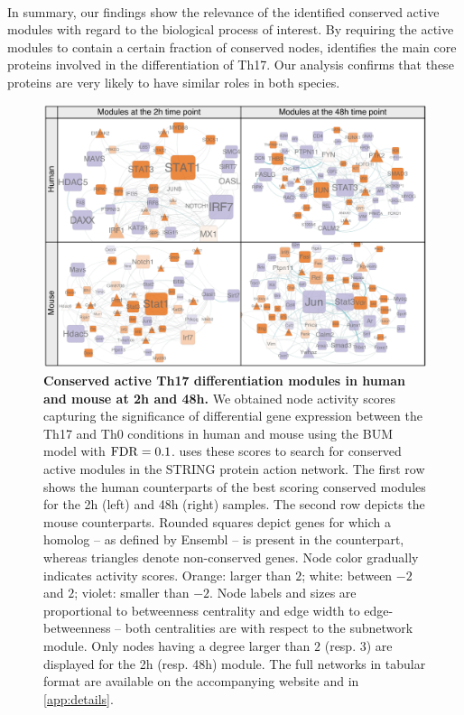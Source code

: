 \paragraph{}
In summary, our findings show the relevance of the identified conserved active modules with regard to the biological process of interest.
By requiring the active modules to contain a certain fraction of conserved nodes, \xheinz{} identifies the main core proteins involved in the differentiation of Th17.
Our analysis confirms that these proteins are very likely to have similar roles in both species.

\begin{figure}[t]
  \centering
  \includegraphics[width=\linewidth]{img/modules_panel.pdf}
  \caption[Conserved active Th17 differentiation modules in human and mouse at \unit{2}{h} and \unit{48}{h}]{\textbf{Conserved active Th17 differentiation modules in human and mouse at \unit{2}{h} and \unit{48}{h}.}
  We obtained node activity scores capturing the significance of differential gene expression between the Th17 and Th0 conditions in human and mouse using the BUM model with $\mathrm{FDR} = 0.1$.
  \xheinz{} uses these scores to search for conserved active modules in the STRING protein action network.
  The first row shows the human counterparts of the best scoring conserved modules for the \unit{2}{h} (left) and \unit{48}{h} (right) samples.
  The second row depicts the mouse counterparts.
  Rounded squares depict genes for which a homolog -- as defined by Ensembl -- is present in the counterpart, whereas triangles denote non-conserved genes.
  Node color gradually indicates activity scores.
  Orange: larger than $2$; white: between $-2$ and $2$; violet: smaller than $-2$.
  Node labels and sizes are proportional to betweenness centrality and edge width to
  edge-betweenness -- both centralities are with respect to the subnetwork module.
  Only nodes having a degree larger than $2$ (resp. $3$) are displayed for the \unit{2}{h} (resp. \unit{48}{h}) module.
  The full networks in tabular format are available on the accompanying website and in \cref{app:details}.
    }
\label{fig:panel_wht-xheinz_modules}
\end{figure}

